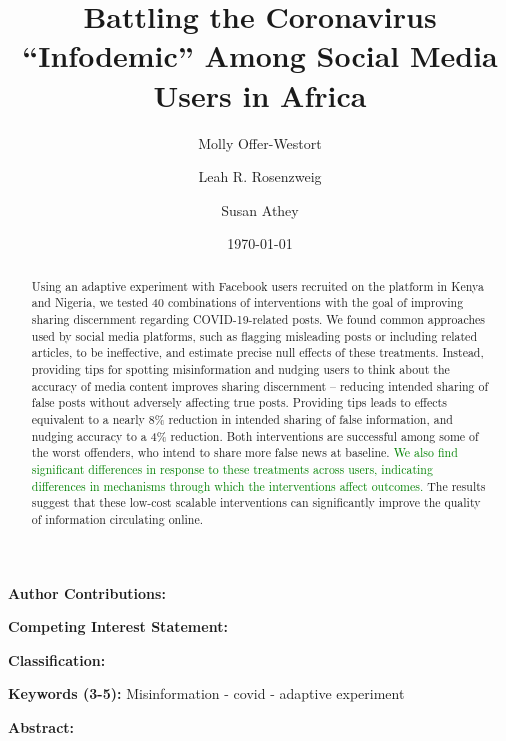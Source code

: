 \documentclass[letterpaper, 12pt, parskip=full,DIV=10]{scrartcl}
\title{Battling the Coronavirus ``Infodemic'' Among Social Media Users in Africa}
\author[1]{Molly Offer-Westort}
\author[2]{Leah R. Rosenzweig}
\author[3]{Susan Athey}
\affil[1]{Department of Political Science, University of Chicago; mollyow@uchicago.edu}
\affil[2]{Development Innovation Lab, University of Chicago}
\affil[3]{Stanford Graduate School of Business, Stanford University}
\date{\today}
\begin{document}
%
\normalsize%
\maketitle%


\textbf{Author Contributions: }

\textbf{Competing Interest Statement: }

\textbf{Classification:} 

\textbf{Keywords (3-5):} Misinformation - covid - adaptive experiment




{\textbf{Abstract:}}
\begin{abstract} %
Using an adaptive experiment with Facebook users recruited on the platform in Kenya and Nigeria, we tested 40 combinations of interventions with the goal of improving sharing discernment regarding COVID-19-related posts. We found common approaches used by social media platforms, such as flagging misleading posts or including related articles, to be ineffective, and estimate precise null effects of these treatments. Instead, providing tips for spotting misinformation and nudging users to think about the accuracy of media content improves sharing discernment -- reducing intended sharing of false posts without adversely affecting true posts. Providing tips leads to effects equivalent to a nearly 8\% reduction in intended sharing of false information, and nudging accuracy to a 4\% reduction.  Both interventions are successful among some of the worst offenders, who intend to share more false news at baseline. %
\textcolor{green}{We also find significant differences in response to these treatments across users, indicating differences in mechanisms through which the interventions affect outcomes. }
The results suggest that these low-cost scalable interventions can significantly improve the quality of information circulating online.

 
\end{abstract}
\end{document}
